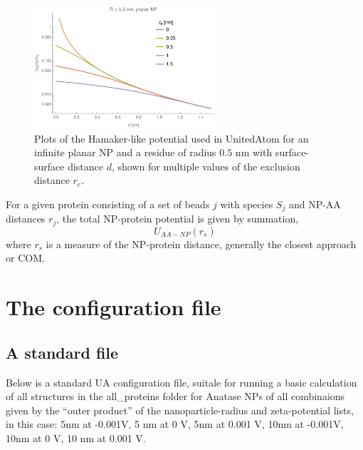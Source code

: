 \documentclass[10pt,a4paper,onecolumn]{report}
\begin{document}
 
\begin{figure} \label{fig:hamaker-exclusion}
    \centering
    \includegraphics[width=0.6\textwidth]{figures/hamaker_magnitude_perresidue.pdf}
    \caption{Plots of the Hamaker-like potential used in UnitedAtom for an infinite planar NP and a residue of radius $0.5$ nm with surface-surface distance $d$, shown for multiple values of the exclusion distance $r_e$.}
\end{figure}
 
 
 
 
 
For a given protein consisting of a set of beads $j$ with species $S_j$ and NP-AA distances $r_j$, the total NP-protein potential is given by summation,
\begin{equation}
U_{AA-NP}(r_s)
\end{equation}
 where $r_s$ is a measure of the NP-protein distance, generally the closest approach or COM. 
 
 
 
\section{The configuration file}
 
\subsection{A standard file} 
 
 
Below is a standard UA configuration file, suitale for running a basic calculation of all structures in the all\_proteins folder for Anatase NPs of all combinaions given by the ``outer product'' of the nanoparticle-radius and zeta-potential lists, in this case: 5nm at -0.001V, 5 nm at 0 V, 5nm at 0.001 V, 10nm at -0.001V, 10nm at 0 V, 10 nm at 0.001 V. 
\end{document}
